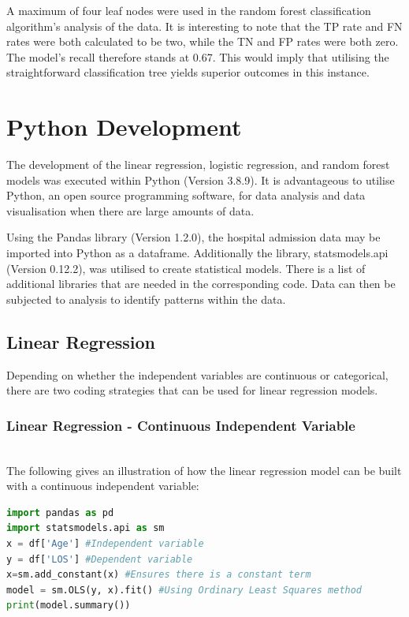 \documentclass[../thesis.tex]{subfiles}
\begin{document}
A maximum of four leaf nodes were used in the random forest classification algorithm's analysis of the data. It is interesting to note that the TP rate and FN rates were both calculated to be two, while the TN and FP rates were both zero. The model's recall therefore stands at 0.67. This would imply that utilising the straightforward classification tree yields superior outcomes in this instance.

\section{Python Development}\label{sec:python}
The development of the linear regression, logistic regression, and random forest models was executed within Python (Version 3.8.9). It is advantageous to utilise Python, an open source programming software, for data analysis and data visualisation when there are large amounts of data.

Using the Pandas library \cite{McKinney2010} (Version 1.2.0), the hospital admission data may be imported into Python as a dataframe. Additionally the library, statsmodels.api \cite{Perktold2022} (Version 0.12.2), was utilised to create statistical models. There is a list of additional libraries that are needed in the corresponding code. Data can then be subjected to analysis to identify patterns within the data.

\subsection{Linear Regression}
Depending on whether the independent variables are continuous or categorical, there are two coding strategies that can be used for linear regression models.

\subsubsection{Linear Regression - Continuous Independent Variable}\\
The following gives an illustration of how the linear regression model can be built with a continuous independent variable:
\begin{lstlisting}[language = python]
import pandas as pd
import statsmodels.api as sm
x = df['Age'] #Independent variable
y = df['LOS'] #Dependent variable
x=sm.add_constant(x) #Ensures there is a constant term
model = sm.OLS(y, x).fit() #Using Ordinary Least Squares method
print(model.summary())
\end{lstlisting}
\end{document}
